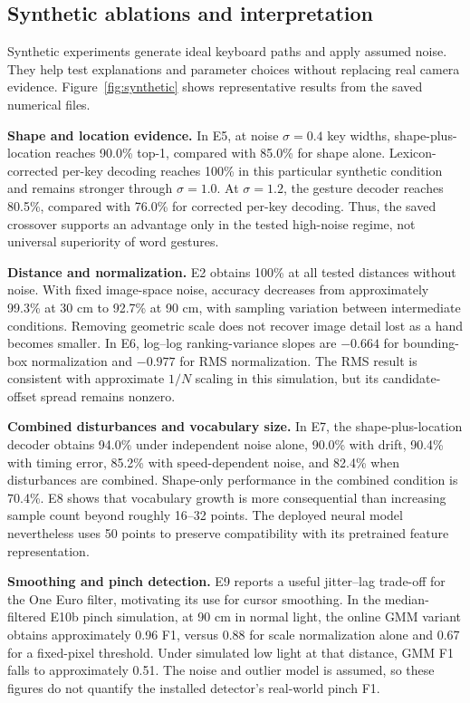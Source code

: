 \subsection{Synthetic ablations and interpretation}
Synthetic experiments generate ideal keyboard paths and apply assumed noise. They help test explanations and parameter choices without replacing real camera evidence. Figure~\ref{fig:synthetic} shows representative results from the saved numerical files.



\textbf{Shape and location evidence.} In E5, at noise $\sigma=0.4$ key widths, shape-plus-location reaches 90.0\% top-1, compared with 85.0\% for shape alone. Lexicon-corrected per-key decoding reaches 100\% in this particular synthetic condition and remains stronger through $\sigma=1.0$. At $\sigma=1.2$, the gesture decoder reaches 80.5\%, compared with 76.0\% for corrected per-key decoding. Thus, the saved crossover supports an advantage only in the tested high-noise regime, not universal superiority of word gestures.

\textbf{Distance and normalization.} E2 obtains 100\% at all tested distances without noise. With fixed image-space noise, accuracy decreases from approximately 99.3\% at 30 cm to 92.7\% at 90 cm, with sampling variation between intermediate conditions. Removing geometric scale does not recover image detail lost as a hand becomes smaller. In E6, log--log ranking-variance slopes are $-0.664$ for bounding-box normalization and $-0.977$ for RMS normalization. The RMS result is consistent with approximate $1/N$ scaling in this simulation, but its candidate-offset spread remains nonzero.

\textbf{Combined disturbances and vocabulary size.} In E7, the shape-plus-location decoder obtains 94.0\% under independent noise alone, 90.0\% with drift, 90.4\% with timing error, 85.2\% with speed-dependent noise, and 82.4\% when disturbances are combined. Shape-only performance in the combined condition is 70.4\%. E8 shows that vocabulary growth is more consequential than increasing sample count beyond roughly 16--32 points. The deployed neural model nevertheless uses 50 points to preserve compatibility with its pretrained feature representation.

\textbf{Smoothing and pinch detection.} E9 reports a useful jitter--lag trade-off for the One Euro filter, motivating its use for cursor smoothing. In the median-filtered E10b pinch simulation, at 90 cm in normal light, the online GMM variant obtains approximately 0.96 F1, versus 0.88 for scale normalization alone and 0.67 for a fixed-pixel threshold. Under simulated low light at that distance, GMM F1 falls to approximately 0.51. The noise and outlier model is assumed, so these figures do not quantify the installed detector's real-world pinch F1.

